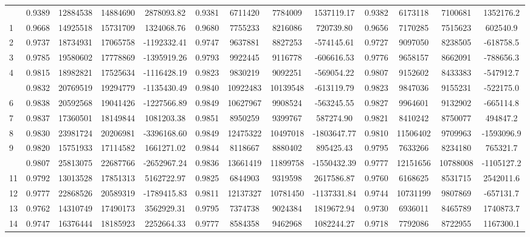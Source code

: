 \documentclass[
  12pt,
]{article}
\begin{document}
\begin{longtable}[t]{lcccccccccccc}
\endfoot
\bottomrule
\endlastfoot
0 & 0.9389 & 12884538 & 14884690 & 2878093.82 & 0.9381 & 6711420 & 7784009 & 1537119.17 & 0.9382 & 6173118 & 7100681 & 1352176.2\\
1 & 0.9668 & 14925518 & 15731709 & 1324068.76 & 0.9680 & 7755233 & 8216086 & 720739.80 & 0.9656 & 7170285 & 7515623 & 602540.9\\
2 & 0.9737 & 18734931 & 17065758 & -1192332.41 & 0.9747 & 9637881 & 8827253 & -574145.61 & 0.9727 & 9097050 & 8238505 & -618758.5\\
3 & 0.9785 & 19580602 & 17778869 & -1395919.26 & 0.9793 & 9922445 & 9116778 & -606616.53 & 0.9776 & 9658157 & 8662091 & -788656.3\\
4 & 0.9815 & 18982821 & 17525634 & -1116428.19 & 0.9823 & 9830219 & 9092251 & -569054.22 & 0.9807 & 9152602 & 8433383 & -547912.7\\
\addlinespace
5 & 0.9832 & 20769519 & 19294779 & -1135430.49 & 0.9840 & 10922483 & 10139548 & -613119.79 & 0.9823 & 9847036 & 9155231 & -522175.0\\
6 & 0.9838 & 20592568 & 19041426 & -1227566.89 & 0.9849 & 10627967 & 9908524 & -563245.55 & 0.9827 & 9964601 & 9132902 & -665114.8\\
7 & 0.9837 & 17360501 & 18149844 & 1081203.38 & 0.9851 & 8950259 & 9399767 & 587274.90 & 0.9821 & 8410242 & 8750077 & 494847.2\\
8 & 0.9830 & 23981724 & 20206981 & -3396168.60 & 0.9849 & 12475322 & 10497018 & -1803647.77 & 0.9810 & 11506402 & 9709963 & -1593096.9\\
9 & 0.9820 & 15751933 & 17114582 & 1661271.02 & 0.9844 & 8118667 & 8880402 & 895425.43 & 0.9795 & 7633266 & 8234180 & 765321.7\\
\addlinespace
10 & 0.9807 & 25813075 & 22687766 & -2652967.24 & 0.9836 & 13661419 & 11899758 & -1550432.39 & 0.9777 & 12151656 & 10788008 & -1105127.2\\
11 & 0.9792 & 13013528 & 17851313 & 5162722.97 & 0.9825 & 6844903 & 9319598 & 2617586.87 & 0.9760 & 6168625 & 8531715 & 2542011.6\\
12 & 0.9777 & 22868526 & 20589319 & -1789415.83 & 0.9811 & 12137327 & 10781450 & -1137331.84 & 0.9744 & 10731199 & 9807869 & -657131.7\\
13 & 0.9762 & 14310749 & 17490173 & 3562929.31 & 0.9795 & 7374738 & 9024384 & 1819672.94 & 0.9730 & 6936011 & 8465789 & 1740873.7\\
14 & 0.9747 & 16376444 & 18185923 & 2252664.33 & 0.9777 & 8584358 & 9462968 & 1082244.27 & 0.9718 & 7792086 & 8722955 & 1167300.1\\

\end{longtable}
\end{document}
